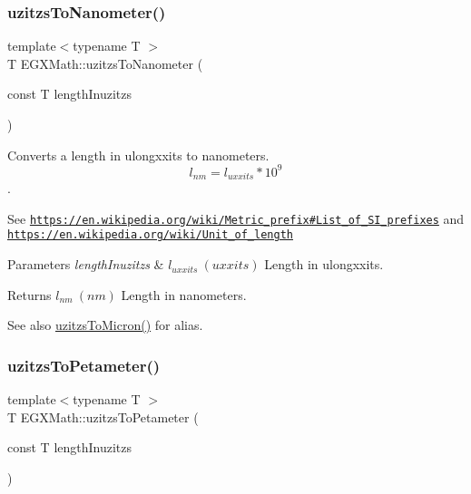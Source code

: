 \subsubsection{\texorpdfstring{uzitzs\+To\+Nanometer()}{uzitzsToNanometer()}}
{\footnotesize\ttfamily template$<$typename T $>$ \\
T E\+G\+X\+Math\+::uzitzs\+To\+Nanometer (\begin{DoxyParamCaption}\item[{const T}]{length\+Inuzitzs }\end{DoxyParamCaption})}



Converts a length in ulongxxits to nanometers. \[ l_{nm}=l_{uxxits} * 10^{9} \]. 

See \href{https://en.wikipedia.org/wiki/Metric_prefix#List_of_SI_prefixes}{\tt https\+://en.\+wikipedia.\+org/wiki/\+Metric\+\_\+prefix\#\+List\+\_\+of\+\_\+\+S\+I\+\_\+prefixes} and \href{https://en.wikipedia.org/wiki/Unit_of_length}{\tt https\+://en.\+wikipedia.\+org/wiki/\+Unit\+\_\+of\+\_\+length} 
\begin{DoxyParams}{Parameters}
{\em length\+Inuzitzs} & $ l_{uxxits}\ (uxxits)$ Length in ulongxxits. \\
\hline
\end{DoxyParams}
\begin{DoxyReturn}{Returns}
$ l_{nm}\ (nm)$ Length in nanometers. 
\end{DoxyReturn}
\begin{DoxySeeAlso}{See also}
\mbox{\hyperlink{group___e_g_x_math-_conversions-_length_conversions-uzitzs-_non-_s_i_ga695a8fd8870537930d6378e99ad2aa9f}{uzitzs\+To\+Micron()}} for alias. 
\end{DoxySeeAlso}
\mbox{\label{group___e_g_x_math-_conversions-_length_conversions-uzitzs-_s_i_gafe93d0226789fd78c2ffa4223eb6af7b}} 
\subsubsection{\texorpdfstring{uzitzs\+To\+Petameter()}{uzitzsToPetameter()}}
{\footnotesize\ttfamily template$<$typename T $>$ \\
T E\+G\+X\+Math\+::uzitzs\+To\+Petameter (\begin{DoxyParamCaption}\item[{const T}]{length\+Inuzitzs }\end{DoxyParamCaption})}




